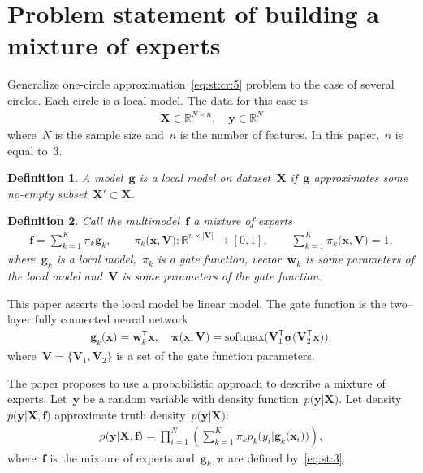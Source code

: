 \documentclass[12pt, twoside]{article}
\newtheorem{definition}{Definition}[section]
\numberwithin{equation}{section}
\begin{document}
\section{Problem statement of building a mixture of experts}
Generalize one-circle approximation~\eqref{eq:st:cr:5} problem to the case of several circles.
Each circle is a local model.
The data for this case is
\[
\label{eq:st:1}
\begin{aligned}
\textbf{X} \in \mathbb{R}^{N \times n}, \quad \textbf{y}\in \mathbb{R}^{N}
\end{aligned}
\]
where~$N$ is the sample size and~$n$ is the number of features. In this paper,~$n$ is equal to~$3$.

\begin{definition}
\label{def:1}
A model~$\mathbf{g}$ is a local model on dataset~$\textbf{X}$ if~$\mathbf{g}$ approximates some no-empty subset~$\textbf{X}'\subset\textbf{X}$.
\end{definition}

\begin{definition}
\label{def:2}
Call the multimodel~$\mathbf{f}$ a mixture of experts
\[
\label{eq:st:2}
\begin{aligned}
\mathbf{f} = \sum_{k=1}^{K}\pi_{k}\mathbf{g}_k, \qquad \pi_{k}\bigr(\mathbf{x}, \mathbf{V}\bigr):\mathbb{R}^{n\times \left|\mathbf{V}\right|} \to [0, 1], \qquad \sum_{k=1}^{K}\pi_{k}\bigr(\mathbf{x}, \mathbf{V}\bigr) = 1,
\end{aligned}
\]
where~$\mathbf{g}_k$ is a local model,~$\pi_k$ is a gate function, vector~$\mathbf{w}_k$ is some parameters of the local model and~$\mathbf{V}$ is some parameters of the gate function.
\end{definition}

This paper asserts the local model be linear model. The gate function is the two--layer fully connected neural network
\[
\label{eq:st:3}
\begin{aligned}
\mathbf{g}_k\bigr(\textbf{x}\bigr) = \textbf{w}_k^{\mathsf{T}}\textbf{x}, \quad
\bm{\pi}\bigr(\mathbf{x}, \mathbf{V}\bigr) = \text{softmax}\bigr(\mathbf{V}_{1}^{\mathsf{T}}\bm{\sigma}\bigr(\mathbf{V}_2^{\mathsf{T}}\mathbf{x}\bigr)\bigr),
\end{aligned}
\]
where~$\mathbf{V} = \bigr\{\mathbf{V}_1, \mathbf{V}_2\bigr\}$ is a set of the gate function parameters.

The paper proposes to use a probabilistic approach to describe a mixture of experts. Let~$\textbf{y}$ be a random variable with density function~$p\bigr(\textbf{y}|\textbf{X}\bigr)$. Let density~$p\bigr(\textbf{y}|\textbf{X}, \textbf{f}\bigr)$ approximate truth density~$p\bigr(\textbf{y}|\textbf{X}\bigr)$:
\[
\label{eq:st:new:1}
\begin{aligned}
p\bigr(\textbf{y}|\textbf{X}, \textbf{f}\bigr) = \prod_{i=1}^{N}\left(\sum_{k=1}^{K}\pi_kp_{k}\bigr(y_{i}|\textbf{g}_{k}\bigr(\mathbf{x}_{i}\bigr)\bigr)\right),
\end{aligned}
\]
where~$\textbf{f}$ is the mixture of experts and~$\textbf{g}_k, \bm{\pi}$ are defined by~\eqref{eq:st:3}.
\end{document}
